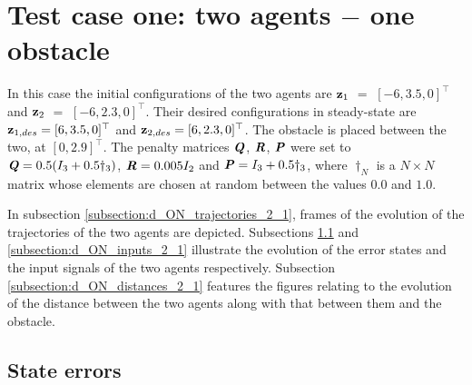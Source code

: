 \section{Test case one: two agents $-$ one obstacle}

In this case the initial configurations of the two agents are
$\bm{\mathbf{z}}_1$ $=$ $[-6, 3.5, 0]^{\top}$ and
$\bm{\mathbf{z}}_2$ $=$ $[-6, 2.3, 0]^{\top}$.
Their desired configurations in steady-state are
$\bm{\mathbf{z}}_{1,des} = [6, 3.5, 0]^{\top}$ and
$\bm{\mathbf{z}}_{2,des} = [6, 2.3, 0]^{\top}$.
The obstacle is placed between the two, at $[0, 2.9]^{\top}$. The penalty
matrices $\bm{\mathit{Q}}$, $\bm{\mathit{R}}$, $\bm{\mathit{P}}$ were set to
$\bm{\mathit{Q}} = 0.5 (I_3 + 0.5 \dagger_3)$, $\bm{\mathit{R}} = 0.005 I_2$ and
$\bm{\mathit{P}} = I_3 + 0.5 \dagger_3$, where $\dagger_N$ is a $N \times N$ matrix whose
elements are chosen at random between the values $0.0$ and $1.0$.

In subsection \ref{subsection:d_ON_trajectories_2_1}, frames of the evolution of the
trajectories of the two agents are depicted. Subsections
\ref{subsection:d_ON_errors_2_1} and \ref{subsection:d_ON_inputs_2_1} illustrate
the evolution of the error states and the input signals of the two agents
respectively. Subsection \ref{subsection:d_ON_distances_2_1} features the
figures relating to the evolution of the distance between the two agents
along with that between them and the obstacle.

\subsection{State errors}
\label{subsection:d_ON_errors_2_1}

\noindent{}


